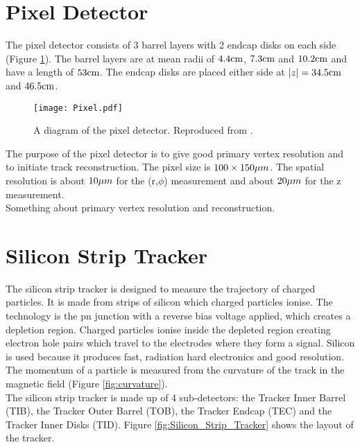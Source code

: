 \section{Pixel Detector}

The pixel detector consists of 3 barrel layers with 2 endcap disks on each side
(Figure \ref{fig:Pixel}). The barrel layers are at mean radii of $4.4\mbox{cm}$,
$7.3\mbox{cm}$ and $10.2\mbox{cm}$ and have a length of $53\mbox{cm}$. The endcap disks are placed 
either side at $|z| = 34.5\mbox{cm}$ and $46.5\mbox{cm}$. \\

\begin{figure}
\texttt{[image: Pixel.pdf]}
\caption{A diagram of the pixel detector. Reproduced from \cite{physics_tdr_1}.}
\label{fig:Pixel}
\end{figure}

The purpose of the pixel detector is to give good primary vertex resolution and
to initiate track reconstruction. The pixel size is $100\times150\mu m$. The 
spatial resolution is about $10\mu m$ for the (r,$\phi$) measurement and about 
$20\mu m$ for the z measurement. \\

Something about primary vertex resolution and reconstruction.

\section{Silicon Strip Tracker}

The silicon strip tracker is designed to measure the trajectory of charged 
particles. It is made from strips of silicon which charged particles ionise. The
technology is the pn junction with a reverse bias voltage applied, which creates
a depletion region. Charged particles ionise inside the depleted region creating
electron hole pairs which travel to the electrodes where they form a signal. 
Silicon is used because it produces fast, radiation hard electronics and good
resolution. \\
  
The momentum of a particle is measured from the curvature of the track in the
magnetic field (Figure \ref{fig:curvature}). \\ 

The silicon strip tracker is made up of 4 sub-detectors: the Tracker Inner 
Barrel (TIB), the Tracker Outer Barrel (TOB), the Tracker Endcap (TEC) and the
Tracker Inner Disks (TID). Figure \ref{fig:Silicon_Strip_Tracker} shows the 
layout of the tracker. \\

